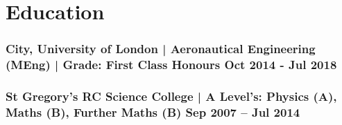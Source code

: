 \documentclass[a4paper, 10pt]{article}
\begin{document}
\section*{Education}
\vspace{-3.5mm}
\subsubsection*{\textbf {City, University of London | Aeronautical Engineering (MEng)} | Grade: First Class Honours   \hfill \textbf{Oct 2014 - Jul 2018}}\FloatBarrier

\vspace{-1.5mm}

\subsubsection*{\textbf{St Gregory’s RC Science College} | A Level's: Physics (A), Maths (B), Further Maths (B) \hfill  \textbf{Sep 2007 – Jul 2014}}

\vspace{1.0mm}
{\titlerule[1.0pt]}

\date{}
\end{document}
